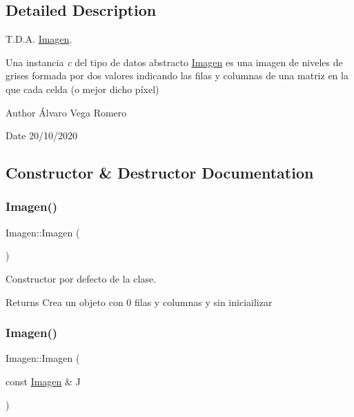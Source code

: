\subsection{Detailed Description}
T.\+D.\+A. \hyperlink{classImagen}{Imagen}. 

Una instancia {\itshape c} del tipo de datos abstracto {\ttfamily \hyperlink{classImagen}{Imagen}} es una imagen de niveles de grises formada por dos valores indicando las filas y columnas de una matriz en la que cada celda (o mejor dicho píxel)

\begin{DoxyAuthor}{Author}
Álvaro Vega Romero 
\end{DoxyAuthor}
\begin{DoxyDate}{Date}
20/10/2020 
\end{DoxyDate}


\subsection{Constructor \& Destructor Documentation}
\mbox{\label{classImagen_ab2e649aa7a105155c7bfdb846abf0528}} 
\subsubsection{\texorpdfstring{Imagen()}{Imagen()}\hspace{0.1cm}{\footnotesize\ttfamily [1/3]}}
{\footnotesize\ttfamily Imagen\+::\+Imagen (\begin{DoxyParamCaption}{ }\end{DoxyParamCaption})}



Constructor por defecto de la clase. 

\begin{DoxyReturn}{Returns}
Crea un objeto con 0 filas y columnas y sin iniciailizar 
\end{DoxyReturn}
\mbox{\label{classImagen_a70437d2848ae5b030ee17cf79651a8b5}} 
\subsubsection{\texorpdfstring{Imagen()}{Imagen()}\hspace{0.1cm}{\footnotesize\ttfamily [2/3]}}
{\footnotesize\ttfamily Imagen\+::\+Imagen (\begin{DoxyParamCaption}\item[{const \hyperlink{classImagen}{Imagen} \&}]{J }\end{DoxyParamCaption})}



